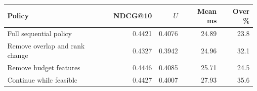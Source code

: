 \begin{tabular}{lrrrr}
\toprule
Policy & NDCG@10 & $U$ & Mean ms & Over \% \\
\midrule
Full sequential policy & 0.4421 & 0.4076 & 24.89 & 23.8 \\
Remove overlap and rank change & 0.4327 & 0.3942 & 24.96 & 32.1 \\
Remove budget features & 0.4446 & 0.4085 & 25.71 & 24.5 \\
Continue while feasible & 0.4427 & 0.4007 & 27.93 & 35.6 \\
\bottomrule
\end{tabular}
